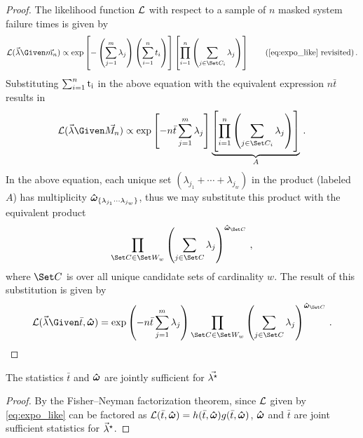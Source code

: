 \documentclass[../main.tex]{subfiles}
\begin{document}
\begin{proof}
The likelihood function $\operatorname{\mathcal{L}}$ with respect to a sample of $n$ masked system failure times is given by
\begin{equation*}
\likelihood(\vec\lambda \Given \mfso) \propto
    \exp \left [ - \left ( \sum_{j=1}^{m} \lambda_j \right ) \left ( \sum_{i=1}^{n} t_i \right ) \right ]
    \left [ \prod_{i=1}^{n} \left ( \sum_{j \in \cand_i} \lambda_j \right ) \right ]\tag{\ref{eq:expo_like} revisited}\,.
\end{equation*}
Substituting $\sum_{i=1}^{n} \rm{t}_i$ in the above equation with the equivalent expression $n \bar{t}$ results in
\begin{equation}
\likelihood(\vec\lambda \Given \mfs) \propto
    \exp \left [ - n \bar{t} \sum_{j=1}^{m} \lambda_j \right ]
    \underbrace{
        \left [ \prod_{i=1}^{n} \left ( \sum_{j \in \cand_i} \lambda_j \right ) \right ]
    }_{A}\,.
\end{equation}
In the above equation, each unique set $\left(\lambda_{j_1} + \cdots + \lambda_{j_w}\right)$ in the product (labeled $A$) has multiplicity $\boldsymbol{\hat\omega}_{\{\lambda_{j_1} \cdots \lambda_{j_w}\}}$, thus we may substitute this product with the equivalent product
\begin{equation}
    \prod_{\cand \in \candsw{w}} \left ( \sum_{j \in \cand} \lambda_j \right )^{\cntsymb_{\cand}}\,,
\end{equation}
where $\cand$ is over all unique candidate sets of cardinality $w$. The result of this substitution is given by
\begin{equation}
\likelihood(\vec\lambda \Given \bar{t}, \cntsymb) =
    \exp \left ( -n \bar{t} \sum_{j=1}^{m} \lambda_j \right )
    \prod_{\cand \in \candsw{w}} \left ( \sum_{j \in \cand} \lambda_j \right )^{\cntsymb_{\cand}}\,.
\end{equation}
\end{proof}

The statistics $\bar{t}$ and $\boldsymbol{\hat\omega}$ are jointly sufficient for $\vec{{\lambda}^{\star}}$
\begin{proof}
By the Fisher–Neyman factorization theorem, since $\operatorname{\mathcal{L}}$ given by \cref{eq:expo_like} can be factored as $\operatorname{\mathcal{L}}(\bar{t}, \boldsymbol{\hat\omega}) = h(\bar{t}, \boldsymbol{\hat\omega}) g(\bar{t}, \boldsymbol{\hat\omega})$, $\boldsymbol{\hat\omega}$ and $\bar t$ are joint sufficient statistics for ${\vec\lambda}^{\star}$.
\end{proof}
\end{document}
